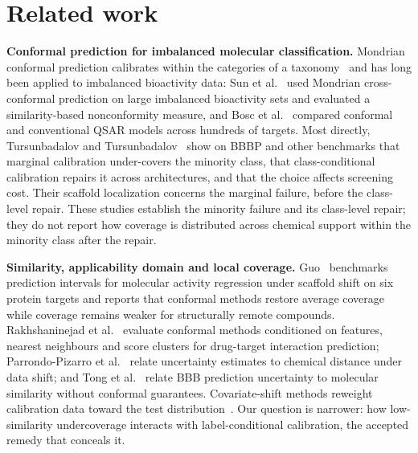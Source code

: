 \documentclass[10pt]{article}
\begin{document}
\section{Related work}\label{sec:related}
\textbf{Conformal prediction for imbalanced molecular classification.} Mondrian conformal prediction calibrates within the categories of a taxonomy~\cite{vovk2005alrw} and has long been applied to imbalanced bioactivity data: Sun et al.~\cite{sun2017mccp} used Mondrian cross-conformal prediction on large imbalanced bioactivity sets and evaluated a similarity-based nonconformity measure, and Bosc et al.~\cite{bosc2019} compared conformal and conventional QSAR models across hundreds of targets. Most directly, Tursunbadalov and Tursunbadalov~\cite{tursunbadalov2026quiet} show on BBBP and other benchmarks that marginal calibration under-covers the minority class, that class-conditional calibration repairs it across architectures, and that the choice affects screening cost. Their scaffold localization concerns the marginal failure, before the class-level repair. These studies establish the minority failure and its class-level repair; they do not report how coverage is distributed across chemical support within the minority class after the repair.

\textbf{Similarity, applicability domain and local coverage.} Guo~\cite{guo2026scaffold} benchmarks prediction intervals for molecular activity regression under scaffold shift on six protein targets and reports that conformal methods restore average coverage while coverage remains weaker for structurally remote compounds. Rakhshaninejad et al.~\cite{rakhshaninejad2025dti} evaluate conformal methods conditioned on features, nearest neighbours and score clusters for drug-target interaction prediction; Parrondo-Pizarro et al.~\cite{parrondopizarro2026uq} relate uncertainty estimates to chemical distance under data shift; and Tong et al.~\cite{tong2022bbbuq} relate BBB prediction uncertainty to molecular similarity without conformal guarantees. Covariate-shift methods reweight calibration data toward the test distribution~\cite{laghuvarapu2023codrug,laghuvarapu2026kmmcp}. Our question is narrower: how low-similarity undercoverage interacts with label-conditional calibration, the accepted remedy that conceals it.
\end{document}

